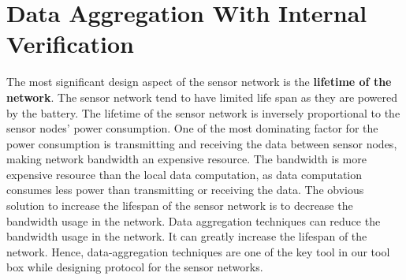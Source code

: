 \chapter{Data Aggregation With Internal Verification} %
\label{cha:Data Aggregation With Internal Verification}
	The most significant design aspect of the sensor network is the \textbf{lifetime of the network}.
	The sensor network tend to have limited life span as they are powered by the battery.
	The lifetime of the sensor network is inversely proportional to the sensor nodes' power consumption.
	One of the most dominating factor for the power consumption is transmitting and receiving the data between sensor nodes, making network bandwidth an expensive resource.
	The bandwidth is more expensive resource than the local data computation, as data computation consumes less power than transmitting or receiving the data.
	The obvious solution to increase the lifespan of the sensor network is to decrease the bandwidth usage in the network.  	
	Data aggregation techniques can reduce the bandwidth usage in the network. 
	It can greatly increase the lifespan of the network.
	Hence, data-aggregation techniques are one of the key tool in our tool box while designing protocol for the sensor networks.

